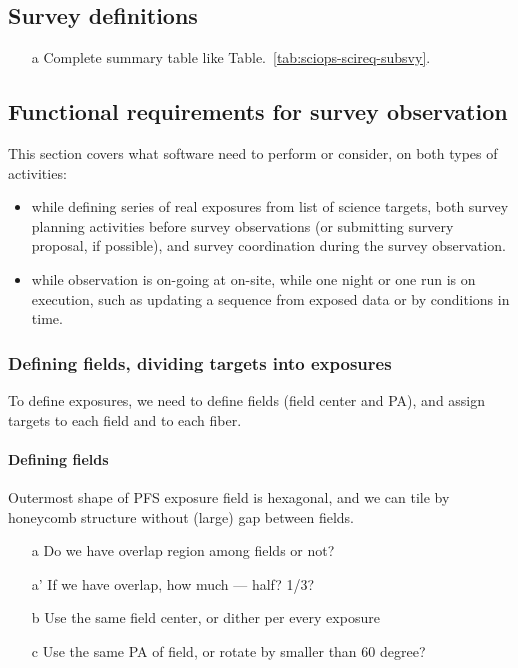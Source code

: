 \documentclass[a4paper,notitlepage]{article}
\newcommand{\colm}[1]{\textcolor{ccolm}{#1}}
\begin{document}
\subsection{Survey definitions}

\begin{enumerate}
  \item[\colm{a}] Complete summary table like Table.~\ref{tab:sciops-scireq-subsvy}.
\end{enumerate}

\subsection{Functional requirements for survey observation}

This section covers what software need to perform or consider, on both
types of activities:
\begin{itemize}
  \item while defining series of real exposures from list of science targets, 
    both survey planning activities before survey observations (or submitting 
    survery proposal, if possible), and survey coordination during the survey 
    observation. 
  \item while observation is on-going at on-site, while one night or one run 
    is on execution, such as updating a sequence from exposed data or by 
    conditions in time. 
\end{itemize}

\subsubsection{Defining fields, dividing targets into exposures}

To define exposures, we need to define fields (field center and PA), and 
assign targets to each field and to each fiber. 

\paragraph{Defining fields}

Outermost shape of PFS exposure field is hexagonal, and we can tile by 
honeycomb structure without (large) gap between fields. 

\begin{enumerate}
  \item[\colm{a}] Do we have overlap region among fields or not?
  \item[\colm{a'}] If we have overlap, how much --- half? 1/3?
  \item[\colm{b}] Use the same field center, or dither per every exposure
  \item[\colm{c}] Use the same PA of field, or rotate by smaller than 60 degree?
\end{enumerate}
\end{document}
